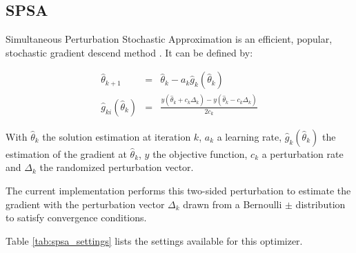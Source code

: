 \documentclass{report}
\begin{document}
\newpage

\subsection{SPSA}
Simultaneous Perturbation Stochastic Approximation is an efficient,
popular, stochastic gradient descend method \cite{spall_multivariate_1992}. It
can be defined by:

\begin{eqnarray*}
	\hat{\theta}_{k + 1} & = & \hat{\theta}_k - a_k \hat{g}_k(\hat{\theta}_k) \\
	\hat{g}_{ki}(\hat{\theta}_k) & = & \frac{y(\hat{\theta}_k + c_k \Delta_k) -
	                                         y(\hat{\theta}_k - c_k \Delta_k)}{2 c_k}
\end{eqnarray*}

With $\hat{\theta}_k$ the solution estimation at iteration $k$, $a_k$ a learning
rate, $\hat{g}_k(\hat{\theta}_k)$ the estimation of the gradient at
$\hat{\theta}_k$, $y$ the objective function, $c_k$ a perturbation rate and
$\Delta_k$ the randomized perturbation vector.

The current implementation performs this two-sided perturbation to estimate the
gradient with the perturbation vector $\Delta_k$ drawn from a Bernoulli $\pm$
distribution to satisfy convergence conditions.

Table \ref{tab:spsa_settings} lists the settings available for this optimizer.
\end{document}

